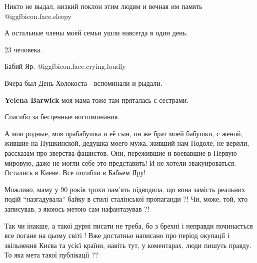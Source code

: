 \begin{itemize}
\begin{itemize}
Никто не выдал, низкий поклон этим людям и вечная им память @igg{fbicon.face.sleepy} 

А остальные члены моей семьи ушли навсегда в один день.

23 человека.

Бабий Яр. @igg{fbicon.face.crying.loudly} 

Вчера был День Холокоста - вспоминали и рыдали.

\textbf{Yelena Barwick} моя мама тоже там пряталась с сестрами.
\end{itemize} %

Спасибо за бесценные воспоминания.


А мои родные, моя прабабушка и её сын, он же брат моей бабушки, с женой, жившие
на Пушкинской, дедушка моего мужа, живший нам Подоле, не верили, рассказам про
зверства фашистов. Они, пережившие и воевавшие в Первую мировую, даже не могли
себе это представить! И не хотели эвакуироваться. Остались в Киеве. Все погибли
в Бабьем Яру!


Можливо, маму у 90 років трохи пам'ять підводила, що вона замість реальних
подій \enquote{назгадувала} байку в стилі сталінської пропаганди ?! Чи, може, той,
хто записував, з якоюсь метою сам нафантазував ?!

Так чи інакше, а такої дурні писати не треба, бо з брехні і неправди
починається все погане на цьому світі ! Вже достатньо написано про період
окупації і звільнення Києва та усієї країни, навіть тут, у коментарах, люди
пишуть правду. То яка мета такої публікації ??

\end{itemize} %
